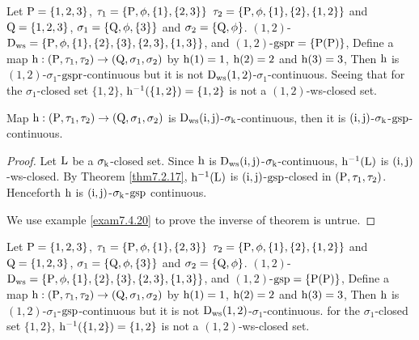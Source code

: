 \begin{exm}\label{exam7.4.18}
Let $\mathrm{P}=\{1,2,3\}$, $\tau_1 =\{\mathrm{P}, \phi, \{1\}, \{2,3\}\}$ $\tau_2 =\{\mathrm{P}, \phi, \{1\},\{2\},\{1,2\}\}$ and $\mathrm{Q}=\{1,2,3\}$, $\sigma_{1} =\{\mathrm{Q}, \phi, \{3\}\}$ and $\sigma_{2} =\{\mathrm{Q}, \phi\}$. $(1, 2)$-$\clrD_{\ws} =\{\TSP, \phi, \{1\},\{2\},\{3\},\break \{2,3\},\{1,3\}\}$, and $(1,2)$-$\mathrm{gspr} =\{\mathrm{P}(\mathrm{P})\}$, Define a map $\mathrm{h}:(\mathrm{P}, \tau_1, \tau_2 )\to (\mathrm{Q}, \sigma_{1}, \sigma_{2} )$ by $\mathrm{h}(1)=1$, $\mathrm{h}(2)=2$ and $\mathrm{h}(3)=3$, Then $\mathrm{h}$ is $(1, 2)$-$\sigma_{1}$-$\mathrm{gspr}$-continuous but it is not $\mathrm{D}_{\mathrm{ws}} (1, 2)$-$\sigma_{1}$-continuous. Seeing that for the $\sigma_{1}$-closed set $\{1,2\}$, $\mathrm{h}^{-1} (\{1,2\})=\{1,2\}$ is not a $(1, 2)$-ws-closed set.
\end{exm}

\begin{thm}\label{thm7.4.19}
Map $\mathrm{h}:(\mathrm{P}, \tau_1, \tau_2 )\to (\mathrm{Q}, \sigma_{1}, \sigma_{2} )$ is $\mathrm{D}_{\mathrm{ws}} (\mathrm{i}, \mathrm{j})$-$\sigma_{\mathrm{k}}$-continuous, then it is $(\mathrm{i}, \mathrm{j})$-$\sigma_{\mathrm{k}}$-$\mathrm{gsp}$-continuous.
\end{thm}

\begin{proof}
Let $\mathrm{L}$ be a $\sigma_{\mathrm{k}}$-closed set. Since $\mathrm{h}$ is $\mathrm{D}_{\mathrm{ws}} (\mathrm{i}, \mathrm{j})$-$\sigma_{\mathrm{k}}$-continuous, $\mathrm{h}^{-1} (\mathrm{L})$ is $(\mathrm{i}, \mathrm{j})$-ws-closed. By Theorem \ref{thm7.2.17}, $\mathrm{h}^{-1} (\mathrm{L})$ is $(\mathrm{i}, \mathrm{j})$-$\mathrm{gsp}$-closed in $(\mathrm{P}, \tau_1, \tau_2 )$. Henceforth $\mathrm{h}$ is $(\mathrm{i}, \mathrm{j})$-$\sigma_{\mathrm{k}}$-$\mathrm{gsp}$ continuous.

We use example \ref{exam7.4.20} to prove the inverse of theorem is untrue.
\end{proof}

\begin{exm}\label{exam7.4.20}
Let $\mathrm{P}=\{1,2,3\}$, $\tau_1 =\{\mathrm{P}, \phi, \{1\}, \{2,3\}\}$ $\tau_2 =\{\mathrm{P}, \phi, \{1\},\{2\},\{1,2\}\}$ and $\mathrm{Q}=\{1,2,3\}$, $\sigma_{1} =\{\mathrm{Q}, \phi, \{3\}\}$ and $\sigma_{2} =\{\mathrm{Q}, \phi\}$. $(1,2)$-$\clrD_{\ws} =\{\TSP, \phi, \{1\},\{2\},\{3\},\break\{2,3\},\{1,3\}\}$, and $(1,2)$-$\mathrm{gsp} =\{\mathrm{P}(\mathrm{P})\}$, Define a map $\mathrm{h}:(\mathrm{P}, \tau_1, \tau_2 )\to (\mathrm{Q}, \sigma_{1}, \sigma_{2} )$ by $\mathrm{h}(1)=1$, $\mathrm{h}(2)=2$ and $\mathrm{h}(3)=3$, Then $\mathrm{h}$ is $(1, 2)$-$\sigma_{1}$-$\mathrm{gsp}$-continuous but it is not $\mathrm{D}_{\mathrm{ws}} (1, 2)$-$\sigma_{1}$-continuous. for the $\sigma_{1}$-closed set $\{1,2\}$, $\mathrm{h}^{-1} (\{1,2\})=\{1,2\}$ is not a $(1, 2)$-ws-closed set.
\end{exm}

